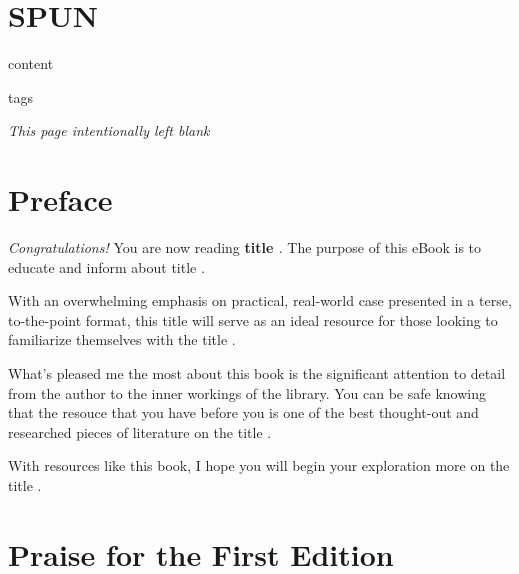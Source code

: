 \documentclass{article}
\begin{document}
\clearpage


\section*{SPUN}

{\normalsize
  {{ content }}
}

\clearpage

{{ tags }}

\clearpage

\noindent
\begin{center}
{\normalsize \emph{This page intentionally left blank}}
\end{center}

\clearpage

\section*{Preface}
{\normalsize
\begin{flushleft}
\emph{Congratulations!} You are now reading \textbf{ {{ title }} }. The
purpose of this eBook is to educate and inform about {{ title }}.
\end{flushleft}

\begin{flushleft}
With an overwhelming emphasis on practical, real-world case presented
in a terse, to-the-point format, this {{ title }} will serve as an
ideal resource for those looking to familiarize themselves with the 
{{ title }}.
\end{flushleft}

\begin{flushleft}
What's pleased me the most about this book is the significant
attention to detail from the author to the inner workings of the
library. You can be safe knowing that the resouce that you have before
you is one of the best thought-out and researched pieces of literature
on the {{ title }}.
\end{flushleft}

\begin{flushleft}
With resources like this book, I hope you will begin your exploration
more on the {{ title }}.
\end{flushleft}
}

\clearpage

\section*{Praise for the First Edition}
\end{document}
